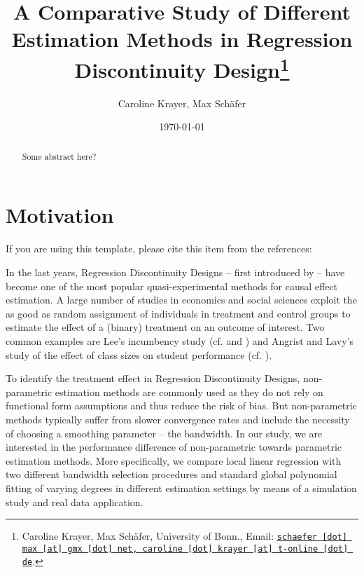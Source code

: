 \documentclass[11pt, a4paper, leqno]{article}
\numberwithin{equation}{section}
\numberwithin{figure}{section}
\numberwithin{table}{section}
\begin{document}
\title{A Comparative Study of Different Estimation Methods in Regression Discontinuity Design\thanks{Caroline Krayer, Max Schäfer, University of Bonn.,  Email: \href{mailto:schaefer.max@gmx.net, caroline.krayer@t-online.de}{\nolinkurl{schaefer [dot] max [at] gmx [dot] net, caroline [dot] krayer [at] t-online [dot] de}}.}}

\author{Caroline Krayer, Max Schäfer}

\date{\today}

\maketitle


\begin{abstract}
	Some abstract here?
\end{abstract}
\thispagestyle{empty}
\addtocounter{page}{-1}
\clearpage

\section{Motivation} %
\label{sec:motivation}

If you are using this template, please cite this item from the references: \citet{GaudeckerEconProjectTemplates}

In the last years, Regression Discontinuity Designs -- first introduced by \cite{thistlethwaite_campbell} -- have become one of the most popular quasi-experimental methods for causal effect estimation. A large number of studies in economics and social sciences exploit the as good as random assignment of individuals in treatment and control groups to estimate the effect of a (binary) treatment on an outcome of interest. Two common examples are Lee's incumbency study (cf. \cite{lee_2001} and \cite{lee_2007})
and Angrist and Lavy's study of the effect of class sizes on student performance (cf. \cite{angrist_lavy}).

To identify the treatment effect in Regression Discontinuity Designs, non-parametric estimation methods are commonly used as they do not rely on functional form assumptions and thus reduce the risk of bias. But non-parametric methods typically suffer from slower convergence rates and include the necessity of choosing a smoothing parameter -- the bandwidth. In our study, we are interested in the performance difference of non-parametric towards parametric estimation methods. More specifically, we compare local linear regression with two different bandwidth selection procedures and standard global polynomial fitting of varying degrees in different estimation settings by means of a simulation study and real data application.
\end{document}
